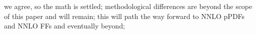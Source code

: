 we agree, so the math is settled;
methodological differences are beyond the scope of this paper and will remain;
this will path the way forward to NNLO pPDFs and NNLO FFs and eventually beyond;
